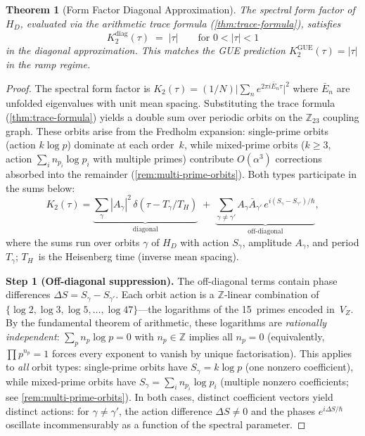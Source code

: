 \documentclass[11pt,a4paper]{article}
\theoremstyle{plain}
\newtheorem{theorem}{Theorem}[section]
\theoremstyle{remark}
\newcommand{\Z}{\mathbb{Z}}
\begin{document}
\begin{theorem}[Form Factor Diagonal Approximation]
\label{thm:form-factor}
The spectral form factor of $H_D$, evaluated via the arithmetic trace
formula (\cref{thm:trace-formula}), satisfies
\[
  K_2^{\mathrm{diag}}(\tau) \;=\; |\tau|
  \qquad\text{for }0<|\tau|<1
\]
in the diagonal approximation.  This matches the GUE prediction
$K_2^{\mathrm{GUE}}(\tau) = |\tau|$ in the ramp regime.
\end{theorem}

\begin{proof}
The spectral form factor is $K_2(\tau)=(1/N)\bigl|\sum_n
e^{2\pi i\bar{E}_n\tau}\bigr|^2$ where $\bar{E}_n$ are unfolded
eigenvalues with unit mean spacing.  Substituting the trace formula
(\cref{thm:trace-formula}) yields a double sum over periodic orbits
on the $\Z_{23}$ coupling graph.  These orbits arise from the Fredholm
expansion: single-prime orbits (action $k\log p$) dominate at each
order~$k$, while mixed-prime orbits ($k\geq 3$, action
$\sum_i n_{p_i}\log p_i$ with multiple primes) contribute
$O(\alpha^3)$ corrections absorbed into the remainder
(\cref{rem:multi-prime-orbits}).  Both types participate in the sums
below:
\begin{equation}\label{eq:form-factor-double-sum}
  K_2(\tau) = \underbrace{\sum_\gamma
    |A_\gamma|^2\,\delta(\tau - T_\gamma/T_H)}
    _{\text{diagonal}}
  \;+\;
  \underbrace{\sum_{\gamma\neq\gamma'}
    A_\gamma \bar A_{\gamma'}\,
    e^{i(S_\gamma - S_{\gamma'})/\hbar}}
    _{\text{off-diagonal}},
\end{equation}
where the sums run over orbits $\gamma$ of $H_D$ with action
$S_\gamma$, amplitude $A_\gamma$, and period $T_\gamma$; $T_H$~is the
Heisenberg time (inverse mean spacing).

\textbf{Step 1 (Off-diagonal suppression).}
The off-diagonal terms contain phase differences
$\Delta S = S_\gamma - S_{\gamma'}$.  Each orbit action is a
$\Z$-linear combination of $\{\log 2, \log 3, \log 5, \ldots,
\log 47\}$---the logarithms of the 15~primes encoded in~$V_Z$.
By the fundamental theorem of arithmetic, these logarithms are
\emph{rationally independent}: $\sum_p n_p \log p = 0$ with
$n_p\in\Z$ implies all $n_p=0$ (equivalently, $\prod p^{n_p}=1$
forces every exponent to vanish by unique factorisation).
This applies to \emph{all} orbit types: single-prime orbits have
$S_\gamma = k\log p$ (one nonzero coefficient), while mixed-prime
orbits have $S_\gamma = \sum_i n_{p_i}\log p_i$ (multiple nonzero
coefficients; see \cref{rem:multi-prime-orbits}).  In both cases,
distinct coefficient vectors yield distinct actions:
for $\gamma\neq\gamma'$, the action difference $\Delta S\neq 0$ and
the phases $e^{i\Delta S/\hbar}$ oscillate incommensurably as a
function of the spectral parameter.


\end{proof}
\end{document}
